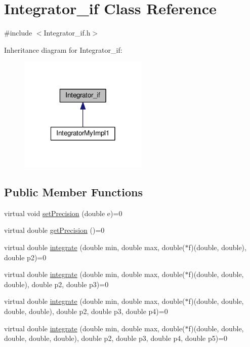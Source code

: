 \hypertarget{class_integrator__if}{\section{Integrator\-\_\-if Class Reference}
\label{class_integrator__if}
}


{\ttfamily \#include $<$Integrator\-\_\-if.\-h$>$}



Inheritance diagram for Integrator\-\_\-if\-:\nopagebreak
\begin{figure}[H]
\begin{center}
\leavevmode
\includegraphics[width=174pt]{class_integrator__if__inherit__graph}
\end{center}
\end{figure}
\subsection*{Public Member Functions}
\begin{DoxyCompactItemize}
\item 
virtual void \hyperlink{class_integrator__if_a49c27818a4b0caf41c39d22a18b41337}{set\-Precision} (double e)=0
\item 
virtual double \hyperlink{class_integrator__if_af3ab4e8ffa96c8970b2e3c980f84e89d}{get\-Precision} ()=0
\item 
virtual double \hyperlink{class_integrator__if_a841c836fd72d4c428178d1e28a999ec9}{integrate} (double min, double max, double($\ast$f)(double, double), double p2)=0
\item 
virtual double \hyperlink{class_integrator__if_a193d992d6101517249d9bee153607aa6}{integrate} (double min, double max, double($\ast$f)(double, double, double), double p2, double p3)=0
\item 
virtual double \hyperlink{class_integrator__if_a306e4fcb840f789d7a918550fa20cc28}{integrate} (double min, double max, double($\ast$f)(double, double, double, double), double p2, double p3, double p4)=0
\item 
virtual double \hyperlink{class_integrator__if_abaeac01142a4da07ba0f07a52732ac79}{integrate} (double min, double max, double($\ast$f)(double, double, double, double, double), double p2, double p3, double p4, double p5)=0
\end{DoxyCompactItemize}


